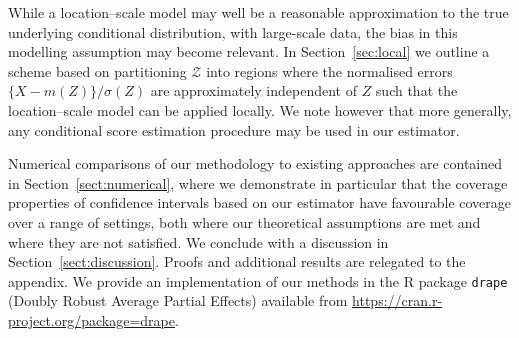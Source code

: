 \documentclass[aos]{imsart}
\begin{document}
	
	While a location--scale model may well be a reasonable approximation to the true underlying conditional distribution, with large-scale data, the bias in this modelling assumption may become relevant. In Section~\ref{sec:local} we outline a scheme based on partitioning $\mathcal{Z}$ into regions where the normalised errors $\{X - m(Z)\} / \sigma(Z)$ are approximately independent of $Z$ such that the location--scale model can be applied locally. We note however that more generally, any conditional score estimation procedure may be used in our estimator.
		
	Numerical comparisons of our methodology to existing approaches are contained in Section~\ref{sect:numerical}, where we demonstrate in particular that the coverage properties of confidence intervals based on our estimator have favourable coverage over a range of settings, both where our theoretical assumptions are met and where they are not satisfied. We conclude with a discussion in Section~\ref{sect:discussion}. Proofs and additional results are relegated to the appendix. We provide an implementation of our methods in the R package \texttt{drape} (Doubly Robust Average Partial Effects) available from \url{https://cran.r-project.org/package=drape}.
	
\end{document}
